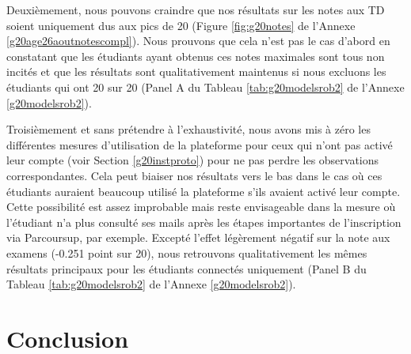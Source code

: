 \documentclass[
]{book}
\begin{document}
\quad Deuxièmement, nous pouvons craindre que nos résultats sur les notes aux TD soient uniquement dus aux pics de 20 (Figure \ref{fig:g20notes} de l'Annexe \ref{g20age26aoutnotescompl}). Nous prouvons que cela n'est pas le cas d'abord en constatant que les étudiants ayant obtenus ces notes maximales sont tous non incités et que les résultats sont qualitativement maintenus si nous excluons les étudiants qui ont 20 sur 20 (Panel A du Tableau \ref{tab:g20modelsrob2} de l'Annexe \ref{g20modelsrob2}).

\quad Troisièmement et sans prétendre à l'exhaustivité, nous avons mis à zéro les différentes mesures d'utilisation de la plateforme pour ceux qui n'ont pas activé leur compte (voir Section \ref{g20instproto}) pour ne pas perdre les observations correspondantes. Cela peut biaiser nos résultats vers le bas dans le cas où ces étudiants auraient beaucoup utilisé la plateforme s'ils avaient activé leur compte. Cette possibilité est assez improbable mais reste envisageable dans la mesure où l'étudiant n'a plus consulté ses mails après les étapes importantes de l'inscription via Parcoursup, par exemple. Excepté l'effet légèrement négatif sur la note aux examens (-0.251 point sur 20), nous retrouvons qualitativement les mêmes résultats principaux pour les étudiants connectés uniquement (Panel B du Tableau \ref{tab:g20modelsrob2} de l'Annexe \ref{g20modelsrob2}).

\hypertarget{g20concl}{%
\section{Conclusion}\label{g20concl}}
\end{document}
